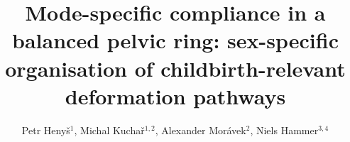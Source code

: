 \documentclass[openacc]{rsproca_new}
\begin{document}
\title{Mode-specific compliance in a balanced pelvic ring: sex-specific organisation of childbirth-relevant deformation pathways}

\author{Petr Heny\v{s}$^{1}$, Michal Kucha\v{r}$^{1,2}$, Alexander Mor\'{a}vek$^{2}$, Niels Hammer$^{3,4}$}

\address{$^{1}$Institute of New Technologies and Applied Informatics, Faculty of Mechatronics, Informatics and Interdisciplinary Studies, Technical University of Liberec, Liberec, Czech Republic\\
$^{2}$Department of Anatomy, Faculty of Medicine in Hradec Kr\'{a}lov\'{e}, Charles University, Hradec Kr\'{a}lov\'{e}, Czech Republic\\
$^{3}$Division of Macroscopic and Clinical Anatomy, Gottfried Schatz Research Center, Medical University of Graz, Graz, Austria\\
$^{4}$Division of Macroscopic and Clinical Anatomy, Gottfried Schatz Research Center, Medical University of Graz, Graz, Austria; Department of Orthopedic and Trauma Surgery, University of Leipzig, Leipzig, Germany; Division of Biomechatronics, Fraunhofer IWU, Dresden, Germany}

\subject{biomechanics, evolutionary anthropology, obstetrics}


\end{document}
